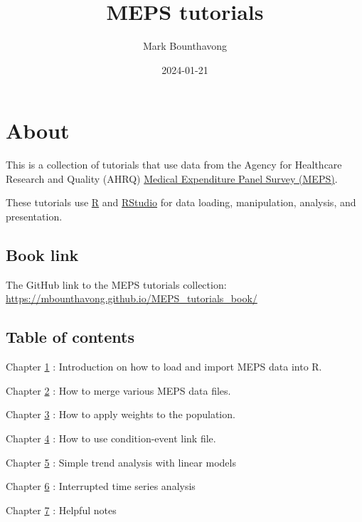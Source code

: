 \documentclass[
]{book}
\title{MEPS tutorials}
\author{Mark Bounthavong}
\date{2024-01-21}
\begin{document}
\maketitle

{
\setcounter{tocdepth}{1}
\tableofcontents
}
\hypertarget{about}{%
\chapter*{About}\label{about}}

This is a collection of tutorials that use data from the Agency for Healthcare Research and Quality (AHRQ) \href{https://meps.ahrq.gov/mepsweb/}{Medical Expenditure Panel Survey (MEPS)}.

These tutorials use \href{https://cran.r-project.org/}{R} and \href{https://posit.co/products/open-source/rstudio/}{RStudio} for data loading, manipulation, analysis, and presentation.

\hypertarget{book-link}{%
\section*{Book link}\label{book-link}}

The GitHub link to the MEPS tutorials collection: \url{https://mbounthavong.github.io/MEPS_tutorials_book/}

\hypertarget{table-of-contents}{%
\section*{Table of contents}\label{table-of-contents}}

Chapter \protect\hyperlink{intro}{1} : Introduction on how to load and import MEPS data into R.

Chapter \protect\hyperlink{merging}{2} : How to merge various MEPS data files.

Chapter \protect\hyperlink{weights}{3} : How to apply weights to the population.

Chapter \protect\hyperlink{clnk}{4} : How to use condition-event link file.

Chapter \protect\hyperlink{trends}{5} : Simple trend analysis with linear models

Chapter \protect\hyperlink{itsa}{6} : Interrupted time series analysis

Chapter \protect\hyperlink{notes}{7} : Helpful notes
\end{document}
